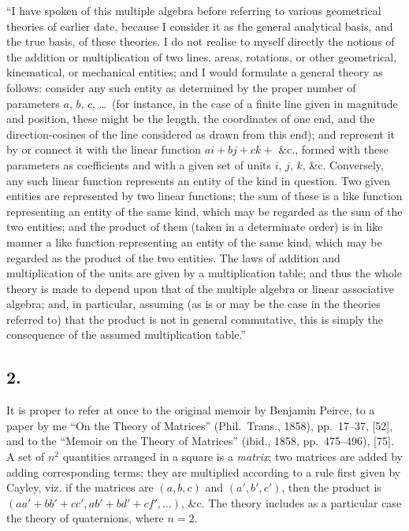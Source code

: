 \documentclass[11pt,a4paper]{article}
\theoremstyle{definition}
\begin{document}
``I have spoken of this multiple algebra before referring to various geometrical theories of earlier date, because I consider it as the general analytical basis, and the true basis, of these theories. I do not realise to myself directly the notions of the addition or multiplication of two lines, areas, rotations, or other geometrical, kinematical, or mechanical entities; and I would formulate a general theory as follows: consider any such entity as determined by the proper number of parameters $a$, $b$, $c$, \ldots\ (for instance, in the case of a finite line given in magnitude and position, these might be the length, the coordinates of one end, and the direction-cosines of the line considered as drawn from this end); and represent it by or connect it with the linear function $ai + bj + ck +$ \&c., formed with these parameters as coefficients and with a given set of units $i$, $j$, $k$, \&c. Conversely, any such linear function represents an entity of the kind in question. Two given entities are represented by two linear functions; the sum of these is a like function representing an entity of the same kind, which may be regarded as the sum of the two entities; and the product of them (taken in a determinate order) is in like manner a like function representing an entity of the same kind, which may be regarded as the product of the two entities. The laws of addition and multiplication of the units are given by a multiplication table; and thus the whole theory is made to depend upon that of the multiple algebra or linear associative algebra; and, in particular, assuming (as is or may be the case in the theories referred to) that the product is not in general commutative, this is simply the consequence of the assumed multiplication table.''

\subsection*{2.}

It is proper to refer at once to the original memoir by Benjamin Peirce, to a paper by me ``On the Theory of Matrices'' (Phil.\ Trans., 1858), pp.~17--37, [52], and to the ``Memoir on the Theory of Matrices'' (ibid., 1858, pp.~475--496), [75]. A set of $n^2$ quantities arranged in a square is a \textit{matrix}; two matrices are added by adding corresponding terms; they are multiplied according to a rule first given by Cayley, viz. if the matrices are $(a, b, c)$ and $(a', b', c')$, then the product is $(aa' + bb' + cc', ab' + bd' + cf', \ldots)$, \&c. The theory includes as a particular case the theory of quaternions, where $n = 2$.
\end{document}
